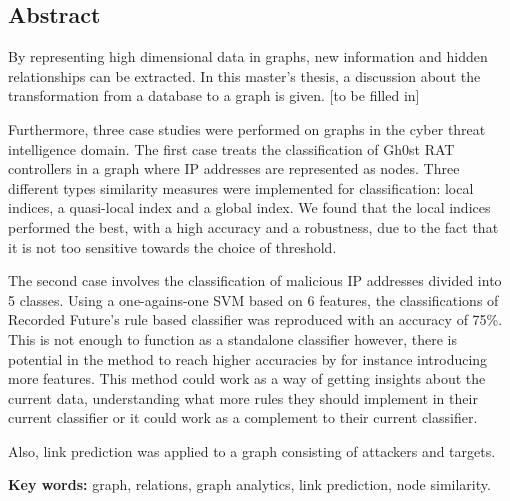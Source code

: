 
\noindent
\begin{comment}
\thesistitle\\
\thesissubtitle\\
\whatthisis\\
\\
\large{%
    Henrik Adolfsson\\
	Josephine Cuellar Andersson\\
}\\
\\
\large{%
	\whereandwhen
}
\vfill
\end{comment}

\begin{center}
    \section*{Abstract}
\end{center}
By representing high dimensional data in graphs, new information and hidden relationships can be extracted. In this master's thesis, a discussion about the transformation from a database to a graph is given. [to be filled in] 

Furthermore, three case studies were performed on graphs in the cyber threat intelligence domain. The first case treats the classification of Gh0st RAT controllers in a graph where IP addresses are represented as nodes. Three different types similarity measures were implemented for classification: local indices, a quasi-local index and a global index. We found that the local indices performed the best, with a high accuracy and a robustness, due to the fact that it is not too sensitive towards the choice of threshold. 

The second case involves the classification of malicious IP addresses divided into 5 classes. Using a one-agains-one SVM based on 6 features, the classifications of Recorded Future's rule based classifier was reproduced with an accuracy of 75\%. This is not enough to function as a standalone classifier however, there is potential in the method to reach higher accuracies by for instance introducing more features. This method could work as a way of getting insights about the current data, understanding what more rules they should implement in their current classifier or it could work as a complement to their current classifier.

Also, link prediction was applied to a graph consisting of attackers and targets. 


\noindent
\textbf{Key words:} graph, relations, graph analytics, link prediction, node similarity.